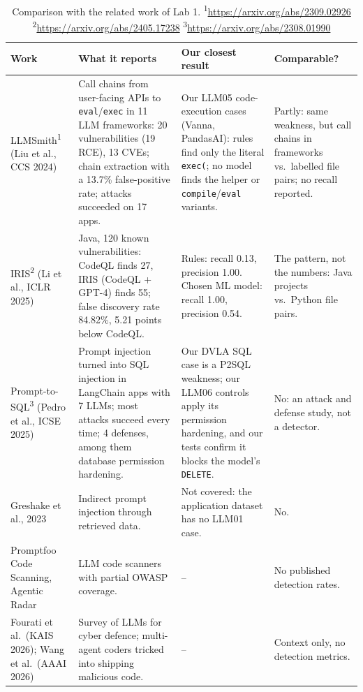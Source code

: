 \documentclass[11pt,a4paper]{article}
\newcommand{\code}[1]{\texttt{#1}}
\begin{document}
\begin{table}[H]
\centering\small
\begin{tabularx}{\linewidth}{@{}>{\raggedright\arraybackslash}p{2.5cm} >{\raggedright\arraybackslash}X >{\raggedright\arraybackslash}X >{\raggedright\arraybackslash}p{2.6cm}@{}}
\toprule
Work & What it reports & Our closest result & Comparable? \\
\midrule
LLMSmith\textsuperscript{1} (Liu et al., CCS 2024) &
Call chains from user-facing APIs to \code{eval}/\code{exec} in 11 LLM frameworks: 20
vulnerabilities (19 RCE), 13 CVEs; chain extraction with a 13.7\% false-positive rate;
attacks succeeded on 17 apps. &
Our LLM05 code-execution cases (Vanna, PandasAI): rules find only the literal
\code{exec(}; no model finds the helper or \code{compile}/\code{eval} variants. &
Partly: same weakness, but call chains in frameworks vs.\ labelled file pairs; no recall
reported. \\
IRIS\textsuperscript{2} (Li et al., ICLR 2025) &
Java, 120 known vulnerabilities: CodeQL finds 27, IRIS (CodeQL + GPT-4) finds 55; false
discovery rate 84.82\%, 5.21 points below CodeQL. &
Rules: recall 0.13, precision 1.00. Chosen ML model: recall 1.00, precision 0.54. &
The pattern, not the numbers: Java projects vs.\ Python file pairs. \\
Prompt-to-SQL\textsuperscript{3} (Pedro et al., ICSE 2025) &
Prompt injection turned into SQL injection in LangChain apps with 7 LLMs; most attacks
succeed every time; 4 defenses, among them database permission hardening. &
Our DVLA SQL case is a P2SQL weakness; our LLM06 controls apply its permission hardening,
and our tests confirm it blocks the model's \code{DELETE}. &
No: an attack and defense study, not a detector. \\
Greshake et al., 2023 &
Indirect prompt injection through retrieved data. &
Not covered: the application dataset has no LLM01 case. &
No. \\
Promptfoo Code Scanning, Agentic Radar &
LLM code scanners with partial OWASP coverage. &
-- &
No published detection rates. \\
Fourati et al.\ (KAIS 2026); Wang et al.\ (AAAI 2026) &
Survey of LLMs for cyber defence; multi-agent coders tricked into shipping malicious
code. &
-- &
Context only, no detection metrics. \\
\bottomrule
\end{tabularx}
\caption{Comparison with the related work of Lab 1.
\textsuperscript{1}\url{https://arxiv.org/abs/2309.02926}
\textsuperscript{2}\url{https://arxiv.org/abs/2405.17238}
\textsuperscript{3}\url{https://arxiv.org/abs/2308.01990}}
\label{tab:sota}
\end{table}
\end{document}
